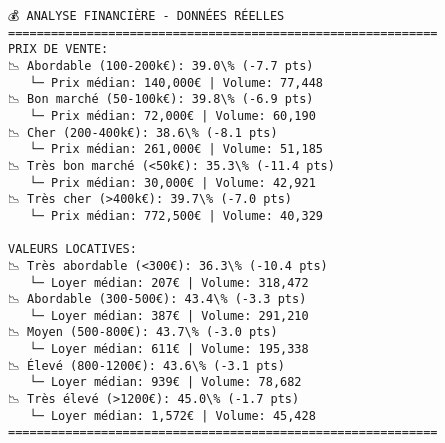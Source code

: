 \documentclass[11pt]{article}
\begin{document}
    \begin{Verbatim}[commandchars=\\\{\}]
💰 ANALYSE FINANCIÈRE - DONNÉES RÉELLES
============================================================
PRIX DE VENTE:
📉 Abordable (100-200k€): 39.0\% (-7.7 pts)
   └─ Prix médian: 140,000€ | Volume: 77,448
📉 Bon marché (50-100k€): 39.8\% (-6.9 pts)
   └─ Prix médian: 72,000€ | Volume: 60,190
📉 Cher (200-400k€): 38.6\% (-8.1 pts)
   └─ Prix médian: 261,000€ | Volume: 51,185
📉 Très bon marché (<50k€): 35.3\% (-11.4 pts)
   └─ Prix médian: 30,000€ | Volume: 42,921
📉 Très cher (>400k€): 39.7\% (-7.0 pts)
   └─ Prix médian: 772,500€ | Volume: 40,329

VALEURS LOCATIVES:
📉 Très abordable (<300€): 36.3\% (-10.4 pts)
   └─ Loyer médian: 207€ | Volume: 318,472
📉 Abordable (300-500€): 43.4\% (-3.3 pts)
   └─ Loyer médian: 387€ | Volume: 291,210
📉 Moyen (500-800€): 43.7\% (-3.0 pts)
   └─ Loyer médian: 611€ | Volume: 195,338
📉 Élevé (800-1200€): 43.6\% (-3.1 pts)
   └─ Loyer médian: 939€ | Volume: 78,682
📉 Très élevé (>1200€): 45.0\% (-1.7 pts)
   └─ Loyer médian: 1,572€ | Volume: 45,428
============================================================
    \end{Verbatim}
\end{document}

